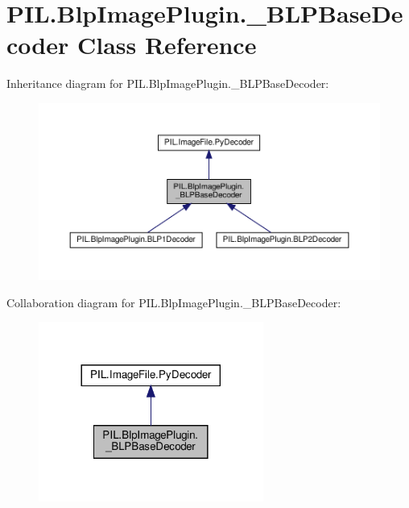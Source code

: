 \hypertarget{classPIL_1_1BlpImagePlugin_1_1__BLPBaseDecoder}{}\section{P\+I\+L.\+Blp\+Image\+Plugin.\+\_\+\+B\+L\+P\+Base\+Decoder Class Reference}
\label{classPIL_1_1BlpImagePlugin_1_1__BLPBaseDecoder}


Inheritance diagram for P\+I\+L.\+Blp\+Image\+Plugin.\+\_\+\+B\+L\+P\+Base\+Decoder\+:
\nopagebreak
\begin{figure}[H]
\begin{center}
\leavevmode
\includegraphics[width=350pt]{classPIL_1_1BlpImagePlugin_1_1__BLPBaseDecoder__inherit__graph}
\end{center}
\end{figure}


Collaboration diagram for P\+I\+L.\+Blp\+Image\+Plugin.\+\_\+\+B\+L\+P\+Base\+Decoder\+:
\nopagebreak
\begin{figure}[H]
\begin{center}
\leavevmode
\includegraphics[width=209pt]{classPIL_1_1BlpImagePlugin_1_1__BLPBaseDecoder__coll__graph}
\end{center}
\end{figure}
